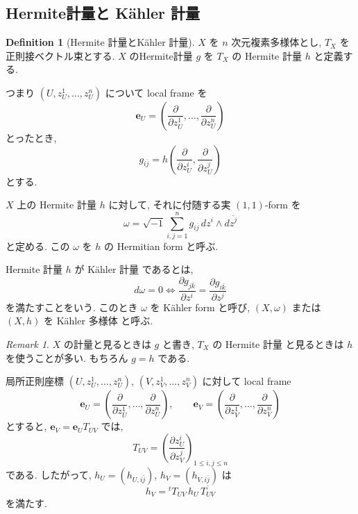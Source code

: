 \documentclass[dvipdfmx,a4paper,11pt]{article} %
\theoremstyle{definition}
\newtheorem{defn}[thm]{Definition}
\theoremstyle{remark}
\newtheorem{rem}[thm]{Remark}
\numberwithin{equation}{section}
\begin{document}
\subsection{Hermite計量と K\"ahler 計量}

\begin{defn}[Hermite 計量とK\"ahler 計量]
\(X\) を \(n\) 次元複素多様体とし, \(T_X\) を正則接ベクトル束とする. \(X\) のHermite計量 \(g\) を \(T_X\) の Hermite 計量 \(h\) と定義する.

つまり \((U,z_U^1,\ldots,z_U^n)\) について local frame を
\[
\mathbf{e}_U=\left(\frac{\partial}{\partial z_U^1},\ldots,\frac{\partial}{\partial z_U^n}\right)
\]
とったとき,
\[
g_{i\overline j}=h\left(\frac{\partial}{\partial z_U^i}, \frac{\partial}{\partial z_U^j}\right)
\]
とする.

\(X\) 上の Hermite 計量 \(h\) に対して, それに付随する実 \((1,1)\)-form を
\[
\omega
=
\sqrt{-1}\sum_{i,j=1}^n g_{i\overline j}\,dz^i\wedge d\overline{z^j}
\]
と定める. この \(\omega\) を \(h\) の Hermitian form と呼ぶ.

Hermite 計量 \(h\) が K\"ahler 計量 であるとは,
\[
d\omega=0 \Leftrightarrow 
\frac{\partial g_{j\overline k}}{\partial z^i}
=
\frac{\partial g_{i\overline k}}{\partial z^j}
\]
を満たすことをいう. このとき \(\omega\) を K\"ahler form と呼び, \((X,\omega)\) または \((X,h)\) を K\"ahler 多様体 と呼ぶ.
\end{defn}
\begin{rem}
\(X\) の計量と見るときは \(g\) と書き, \(T_X\) の Hermite 計量 と見るときは \(h\) を使うことが多い. もちろん \(g=h\) である.
\end{rem}

局所正則座標 \((U,z_U^1,\ldots,z_U^n)\), \((V,z_V^1,\ldots,z_V^n)\) に対して local frame
\[
\mathbf{e}_U=\left(\frac{\partial}{\partial z_U^1},\ldots,\frac{\partial}{\partial z_U^n}\right),\qquad
\mathbf{e}_V=\left(\frac{\partial}{\partial z_V^1},\ldots,\frac{\partial}{\partial z_V^n}\right)
\]
とすると, \(\mathbf{e}_V=\mathbf{e}_U T_{UV}\) では,
\[
T_{UV}=
\left(
\frac{\partial z_U^i}{\partial z_V^j}
\right)_{1\leq i,j\leq n}
\]
である. したがって, \(h_U=(h_{U,i\overline j})\), \(h_V=(h_{V,i\overline j})\) は
\[
h_V={}^{t}T_{UV}\,h_U\,\overline{T_{UV}}
\]
を満たす.
\end{document}
